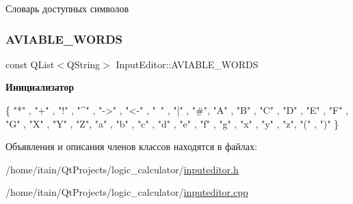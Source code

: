 Словарь доступных символов 

\mbox{\label{class_input_editor_a2c1e4bffaceced12c4f13e3f19a80fb7}} 
\subsubsection{\texorpdfstring{A\+V\+I\+A\+B\+L\+E\+\_\+\+W\+O\+R\+DS}{AVIABLE\_WORDS}}
{\footnotesize\ttfamily const Q\+List$<$Q\+String$>$ Input\+Editor\+::\+A\+V\+I\+A\+B\+L\+E\+\_\+\+W\+O\+R\+DS}

{\bfseries Инициализатор}
\begin{DoxyCode}
\{
        \textcolor{stringliteral}{"*"} , \textcolor{stringliteral}{"+"} , \textcolor{stringliteral}{"!"} , \textcolor{stringliteral}{"^"} , \textcolor{stringliteral}{"->"} , \textcolor{stringliteral}{"<-"} , \textcolor{stringliteral}{"~"} , \textcolor{stringliteral}{"|"} , \textcolor{stringliteral}{"#"},
        \textcolor{stringliteral}{"A"} , \textcolor{stringliteral}{"B"} , \textcolor{stringliteral}{"C"} , \textcolor{stringliteral}{"D"} , \textcolor{stringliteral}{"E"} , \textcolor{stringliteral}{"F"} , \textcolor{stringliteral}{"G"} , \textcolor{stringliteral}{"X"} , \textcolor{stringliteral}{"Y"} , \textcolor{stringliteral}{"Z"},
        \textcolor{stringliteral}{"a"} , \textcolor{stringliteral}{"b"} , \textcolor{stringliteral}{"c"} , \textcolor{stringliteral}{"d"} , \textcolor{stringliteral}{"e"} , \textcolor{stringliteral}{"f"} , \textcolor{stringliteral}{"g"} , \textcolor{stringliteral}{"x"} , \textcolor{stringliteral}{"y"} , \textcolor{stringliteral}{"z"},
        \textcolor{stringliteral}{"("} , \textcolor{stringliteral}{")"}
    \}
\end{DoxyCode}


Объявления и описания членов классов находятся в файлах\+:\begin{DoxyCompactItemize}
\item 
/home/itain/\+Qt\+Projects/logic\+\_\+calculator/\hyperlink{inputeditor_8h}{inputeditor.\+h}\item 
/home/itain/\+Qt\+Projects/logic\+\_\+calculator/\hyperlink{inputeditor_8cpp}{inputeditor.\+cpp}\end{DoxyCompactItemize}
